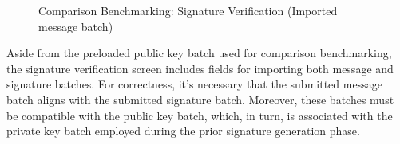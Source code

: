 \documentclass[]{final_report}
\begin{document}
\begin{figure}[H]
\begin{minipage}{0.58\textwidth}
       \caption{Comparison Benchmarking: Signature Verification (Imported message batch)}
        \label{fig:image2}
    \end{minipage}
\end{figure}

Aside from the preloaded public key batch used for comparison benchmarking, the signature verification screen includes fields for importing both message and signature batches. For correctness, it's necessary that the submitted message batch aligns with the submitted signature batch. Moreover, these batches must be compatible with the public key batch, which, in turn, is associated with the private key batch employed during the prior signature generation phase.
\end{document}
